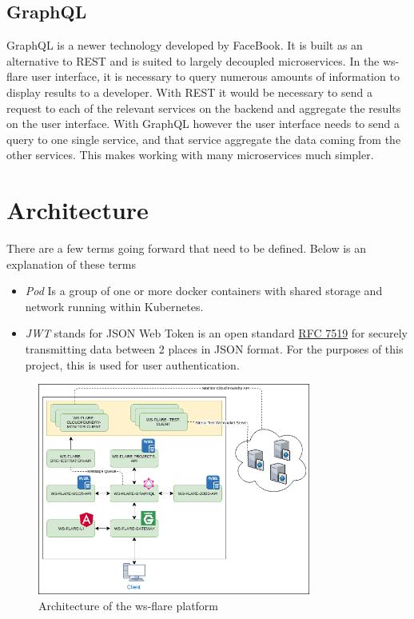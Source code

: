 \subsection{GraphQL}

GraphQL is a newer technology developed by FaceBook. It is built as an alternative to REST and is suited to largely decoupled microservices. In the ws-flare user interface, it is necessary to query numerous amounts of information to display results to a developer. With REST it would be necessary to send a request to each of the relevant services on the backend and aggregate the results on the user interface. With GraphQL however the user interface needs to send a query to one single service, and that service aggregate the data coming from the other services. This makes working with many microservices much simpler.

\section{Architecture}

There are a few terms going forward that need to be defined. Below is an explanation of these terms

\begin{itemize}
  \item \emph{Pod} Is a group of one or more docker containers with shared storage and network running within Kubernetes.
  \item \emph{JWT} stands for JSON Web Token is an open standard \href{https://tools.ietf.org/html/rfc7519}{RFC 7519} for securely transmitting data between 2 places in JSON format. For the purposes of this project, this is used for user authentication.
\end{itemize}

\begin{figure}[!h]
  \centering
    \includegraphics[width=0.8\textwidth]{figures/architecture.png}
    \caption{Architecture of the ws-flare platform}
    \label{fig:https-handshake}
\end{figure}

